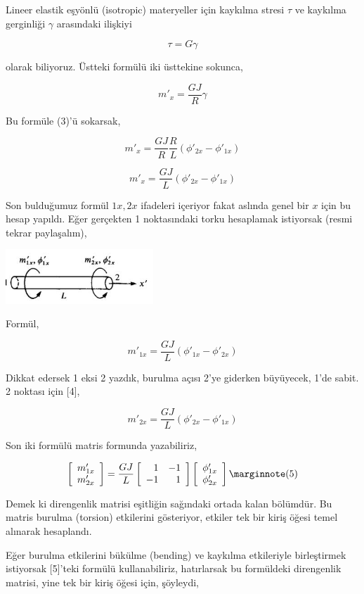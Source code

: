 \documentclass[12pt,fleqn]{article}\usepackage{../../common}
\begin{document}
Lineer elastik eşyönlü (isotropic) materyeller için kaykılma stresi $\tau$
ve kaykılma gerginliği $\gamma$ arasındaki ilişkiyi

$$
\tau = G \gamma
$$

olarak biliyoruz. Üstteki formülü iki üsttekine sokunca,

$$
m'_x = \frac{G J}{R} \gamma
$$

Bu formüle (3)'ü sokarsak, 

$$
m'_x = \frac{G J}{R} \frac{R}{L} ( \phi'_{2x} - \phi'_{1x}  )
$$

$$
m'_x = \frac{G J}{L} ( \phi'_{2x} - \phi'_{1x}  )
$$

Son bulduğumuz formül $1x,2x$ ifadeleri içeriyor fakat aslında genel bir
$x$ için bu hesap yapıldı. Eğer gerçekten 1 noktasındaki torku hesaplamak
istiyorsak (resmi tekrar paylaşalım),

\includegraphics[width=15em]{compscieng_bpp43fem_02.jpg}

Formül,

$$
m'_{1x} = \frac{G J}{L} ( \phi'_{1x} - \phi'_{2x}  )
$$

Dikkat edersek 1 eksi 2 yazdık, burulma açısı 2'ye giderken büyüyecek, 1'de
sabit. 2 noktası için [4],

$$
m'_{2x} = \frac{G J}{L} ( \phi'_{2x} - \phi'_{1x}  )
$$

Son iki formülü matris formunda yazabiliriz,

$$
\left[\begin{array}{c}
m'_{1x} \\ m'_{2x} 
\end{array}\right] =
\frac{GJ}{L}
\left[\begin{array}{rr}
1 & -1 \\ -1 & 1
\end{array}\right]
\left[\begin{array}{c}
\phi'_{1x} \\ \phi'_{2x} 
\end{array}\right]
\mlabel{5}
$$

Demek ki direngenlik matrisi eşitliğin sağındaki ortada kalan bölümdür. Bu
matris burulma (torsion) etkilerini gösteriyor, etkiler tek bir kiriş öğesi
temel alınarak hesaplandı.

Eğer burulma etkilerini bükülme (bending) ve kaykılma etkileriyle birleştirmek
istiyorsak [5]'teki formülü kullanabiliriz, hatırlarsak bu formüldeki
direngenlik matrisi, yine tek bir kiriş öğesi için, şöyleydi,
\end{document}
